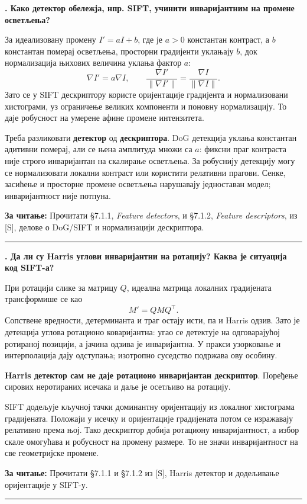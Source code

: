 \documentclass[10pt,a4paper]{article}
\newcommand{\en}[1]{\textit{#1}}
\newcounter{pitanje}
\newenvironment{odgovor}[1]{\stepcounter{pitanje}\begin{minipage}[t][0.455\textheight][t]{\textwidth}\vspace{0pt}\textbf{\thepitanje. #1}\par\smallskip}{\end{minipage}\par\ifodd\value{pitanje}\vspace{0.025\textheight}\hrule\vspace{0.015\textheight}\else\newpage\fi}
\newcommand{\izvor}[1]{\par\vfill{\footnotesize\textbf{За читање:} #1}\par}
\begin{document}
\begin{odgovor}{Како детектор обележја, нпр. SIFT, учинити инваријантним на промене осветљења?}
За идеализовану промену $I'=aI+b$, где је $a>0$ константан контраст, а $b$ константан померај осветљења, просторни градијенти уклањају $b$, док нормализација њихових величина уклања фактор $a$:
\[
\nabla I'=a\nabla I,\qquad
\frac{\nabla I'}{\|\nabla I'\|}=\frac{\nabla I}{\|\nabla I\|}.
\]
Зато се у SIFT дескриптору користе оријентације градијента и нормализовани хистограми, уз ограничење великих компоненти и поновну нормализацију. То даје робусност на умерене афине промене интензитета.

Треба разликовати \textbf{детектор} од \textbf{дескриптора}. DoG детекција уклања константан адитивни померај, али се њена амплитуда множи са $a$: фиксни праг контраста није строго инваријантан на скалирање осветљења. За робуснију детекцију могу се нормализовати локални контраст или користити релативни прагови. Сенке, засићење и просторне промене осветљења нарушавају једноставан модел; инваријантност није потпуна.
\izvor{Прочитати §7.1.1, \en{Feature detectors}, и §7.1.2, \en{Feature descriptors}, из [S], делове о DoG/SIFT и нормализацији дескриптора.}
\end{odgovor}

\begin{odgovor}{Да ли су Harris углови инваријантни на ротацију? Каква је ситуација код SIFT-а?}
При ротацији слике за матрицу $Q$, идеална матрица локалних градијената трансформише се као
\[
M'=QMQ^\top.
\]
Сопствене вредности, детерминанта и траг остају исти, па и Harris одзив. Зато је детекција углова ротационо коваријантна: угао се детектује на одговарајућој ротираној позицији, а јачина одзива је инваријантна. У пракси узорковање и интерполација дају одступања; изотропно суседство подржава ову особину.

\textbf{Harris детектор сам не даје ротационо инваријантан дескриптор}. Поређење сирових неротираних исечака и даље је осетљиво на ротацију.

SIFT додељује кључној тачки доминантну оријентацију из локалног хистограма градијената. Положаји у исечку и оријентације градијената потом се изражавају релативно према њој. Тако дескриптор добија ротациону инваријантност, а избор скале омогућава и робусност на промену размере. То не значи инваријантност на све геометријске промене.
\izvor{Прочитати §7.1.1 и §7.1.2 из [S], Harris детектор и додељивање оријентације у SIFT-у.}
\end{odgovor}
\end{document}
